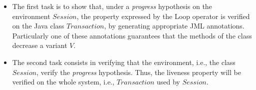 \begin{itemize}
\item The first task is to show that, under a \textit{progress}
hypothesis on the environment $Session$, the property expressed by
the \textsf{Loop} operator is verified on the Java class 
$Transaction$, by generating appropriate
JML annotations. Particularly %
one of 
these annotations guarantees that the methods of the class decrease
a variant $V$.  


\item %
The second task consists in verifying 
that the environment, i.e., the class $Session$, verify the
\textit{progress} hypothesis. Thus, the liveness property
will be verified on the whole system, i.e., $Transaction$ used by $Session$.
\end{itemize}





